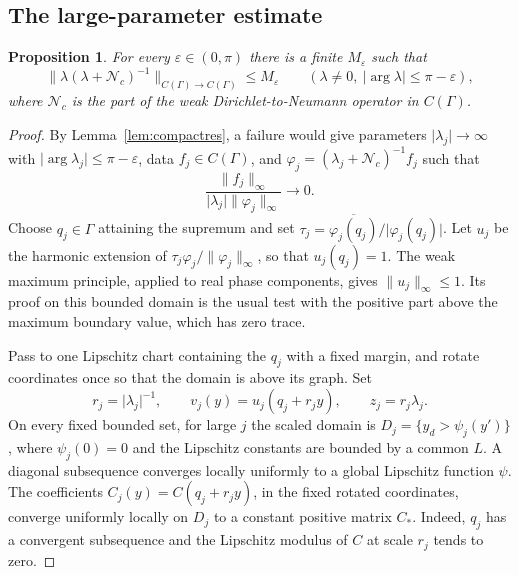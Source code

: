 \documentclass[11pt]{article}
\newtheorem{proposition}[theorem]{Proposition}
\newcommand{\Nc}{\mathcal N_c}
\newcommand{\norm}[1]{\lVert #1\rVert}
\newcommand{\abs}[1]{\lvert #1\rvert}
\begin{document}
\subsection{The large-parameter estimate}

\begin{proposition}\label{prop:resolvent}
For every $\varepsilon\in(0,\pi)$ there is a finite $M_\varepsilon$ such that
\[
 \norm{\lambda(\lambda+\Nc)^{-1}}_{C(\Gamma)\to C(\Gamma)}
    \leq M_\varepsilon
 \qquad(\lambda\ne0,\ \abs{\arg\lambda}\leq\pi-\varepsilon),
\]
where $\Nc$ is the part of the weak Dirichlet-to-Neumann operator in $C(\Gamma)$.
\end{proposition}

\begin{proof}
By Lemma~\ref{lem:compactres}, a failure would give parameters
$\abs{\lambda_j}\to\infty$ with $\abs{\arg\lambda_j}\leq\pi-\varepsilon$,
data $f_j\in C(\Gamma)$, and
$\varphi_j=(\lambda_j+\Nc)^{-1}f_j$ such that
\begin{equation}\label{eq:fail}
 \frac{\norm{f_j}_\infty}{\abs{\lambda_j}\norm{\varphi_j}_\infty}\longrightarrow0.
\end{equation}
Choose $q_j\in\Gamma$ attaining the supremum and set
$\tau_j=\overline{\varphi_j(q_j)}/\abs{\varphi_j(q_j)}$. Let $u_j$ be the
harmonic extension of $\tau_j\varphi_j/\norm{\varphi_j}_\infty$, so that
$u_j(q_j)=1$. The weak maximum principle,
applied to real phase components, gives $\norm{u_j}_\infty\leq1$.
Its proof on this bounded domain is the usual test with the positive part
above the maximum boundary value, which has zero trace.

Pass to one Lipschitz chart containing the $q_j$ with a fixed margin, and
rotate coordinates once so that the domain is above its graph. Set
\[
 r_j=\abs{\lambda_j}^{-1},\qquad
 v_j(y)=u_j(q_j+r_jy),\qquad z_j=r_j\lambda_j.
\]
On every fixed bounded set, for large $j$ the scaled domain is
$D_j=\{y_d>\psi_j(y')\}$, where $\psi_j(0)=0$ and the Lipschitz constants
are bounded by a common $L$. A diagonal subsequence converges locally
uniformly to a global Lipschitz function $\psi$.
The coefficients $C_j(y)=C(q_j+r_jy)$, in the fixed rotated coordinates,
converge uniformly locally on $D_j$ to a constant positive matrix $C_*$.
Indeed, $q_j$ has a convergent subsequence and the Lipschitz modulus of $C$
at scale $r_j$ tends to zero.


\end{proof}
\end{document}
